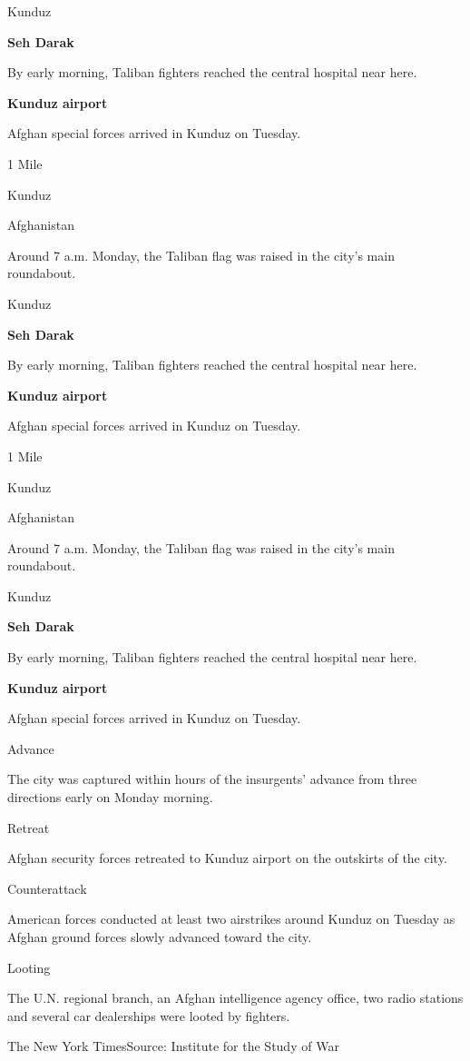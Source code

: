 Kunduz

\textbf{Seh Darak}

By early morning, Taliban fighters reached the central hospital near
here.

\textbf{Kunduz airport}

Afghan special forces arrived in Kunduz on Tuesday.

1 Mile

Kunduz

Afghanistan

Around 7 a.m. Monday, the Taliban flag was raised in the city's main
roundabout.

Kunduz

\textbf{Seh Darak}

By early morning, Taliban fighters reached the central hospital near
here.

\textbf{Kunduz airport}

Afghan special forces arrived in Kunduz on Tuesday.

1 Mile

Kunduz

Afghanistan

Around 7 a.m. Monday, the Taliban flag was raised in the city's main
roundabout.

Kunduz

\textbf{Seh Darak}

By early morning, Taliban fighters reached the central hospital near
here.

\textbf{Kunduz airport}

Afghan special forces arrived in Kunduz on Tuesday.

Advance

The city was captured within hours of the insurgents' advance from three
directions early on Monday morning.

Retreat

Afghan security forces retreated to Kunduz airport on the outskirts of
the city.

Counterattack

American forces conducted at least two airstrikes around Kunduz on
Tuesday as Afghan ground forces slowly advanced toward the city.

Looting

The U.N. regional branch, an Afghan intelligence agency office, two
radio stations and several car dealerships were looted by fighters.

The New York Times\textbar{}Source: Institute for the Study of War

